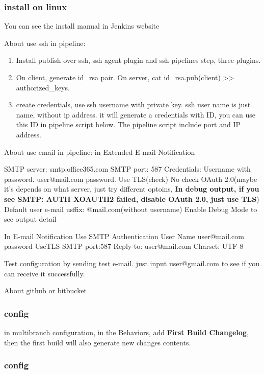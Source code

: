 \documentclass[paper=8.5in:11in, twoside, 12pt, pagesize=pdftex]{book}
\begin{document}
\subsubsection{install on linux}
You can see the install manual in Jenkins website


About use ssh in pipeline:
\begin{enumerate}
	\item Install publish over ssh, ssh agent plugin and ssh pipelines step, three plugins.
	
	
	\item On client, generate id\_rsa pair. On server, cat id\_rsa.pub(client) >> authorized\_keys. 
	 
	\item create credentials, use ssh username with private key. ssh user name is just name, without ip address. it will generate a credentials with ID, you can use this ID in pipeline script below. The pipeline script include port and IP address.   
\end{enumerate}


About use email in pipeline:
in Extended E-mail Notification

SMTP server: smtp.office365.com
SMTP port: 587
Credentials: Username with password.  user@mail.com password. 
Use TLS(check) No check OAuth 2.0(maybe it's depends on what server, just try different optoins, \textbf{In debug output, if you see SMTP: AUTH XOAUTH2 failed, disable OAuth 2.0, just use TLS})
Default user e-mail usffix: @mail.com(without username)
Enable Debug Mode to see output detail

In E-mail Notification
Use SMTP Authentication
User Name user@mail.com
password
UseTLS
SMTP port:587
Reply-to: user@mail.com
Charset:
UTF-8

Test configuration by sending test e-mail. just input user@gmail.com to see if you can receive it successfully. 


About github or bitbucket 

\subsubsection{config}
in multibranch configuration, in the Behaviors, add \textbf{First Build Changelog}, then the first build will also generate new changes contents. 

\subsubsection{config}
\end{document}

